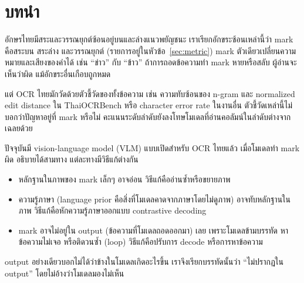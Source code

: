 \section{บทนำ}
อักษรไทยมีสระและวรรณยุกต์ซ้อนอยู่บนและล่างแนวพยัญชนะ เราเรียกอักขระซ้อนเหล่านี้ว่า mark คือสระบน สระล่าง และวรรณยุกต์ (รายการอยู่ในหัวข้อ~\ref{sec:metric}) mark ตัวเดียวเปลี่ยนความหมายและเสียงของคำได้ เช่น ``ข่าว'' กับ ``ข้าว'' ถ้าการถอดข้อความทำ mark หายหรือสลับ ผู้อ่านจะเห็นว่าผิด แม้อักขระอื่นเกือบถูกหมด

แต่ OCR ไทยมักวัดด้วยตัวชี้วัดของทั้งข้อความ เช่น ความทับซ้อนของ n-gram และ normalized edit distance ใน ThaiOCRBench \cite{nonesung2025thaiocrbench} หรือ character error rate ในงานอื่น ตัวชี้วัดเหล่านี้ไม่บอกว่าปัญหาอยู่ที่ mark หรือไม่ คะแนนระดับลำดับยังลงโทษโมเดลที่อ่านคอลัมน์ในลำดับต่างจากเฉลยด้วย

ปัจจุบันมี vision-language model (VLM) แบบเปิดสำหรับ OCR ไทยแล้ว \cite{nonesung2026typhoonocr,nectec2026pathumma,pipatanakul2026synthetic} เมื่อโมเดลทำ mark ผิด อธิบายได้สามทาง แต่ละทางมีวิธีแก้ต่างกัน
\begin{itemize}
\item หลักฐานในภาพของ mark เล็กๆ อาจอ่อน วิธีแก้คืออ่านซ้ำหรือขยายภาพ
\item ความรู้ภาษา (language prior คือสิ่งที่โมเดลคาดจากภาษาโดยไม่ดูภาพ) อาจทับหลักฐานในภาพ วิธีแก้คือหักความรู้ภาษาออกแบบ contrastive decoding \cite{leng2024vcd,favero2024m3id}
\item mark อาจไม่อยู่ใน output (ข้อความที่โมเดลถอดออกมา) เลย เพราะโมเดลข้ามบรรทัด หาข้อความไม่เจอ หรือติดวนซ้ำ (loop) วิธีแก้คือปรับการ decode หรือการหาข้อความ
\end{itemize}
output อย่างเดียวบอกไม่ได้ว่าข้างในโมเดลเกิดอะไรขึ้น เราจึงเรียกบรรทัดนั้นว่า ``ไม่ปรากฏใน output'' โดยไม่อ้างว่าโมเดลมองไม่เห็น

